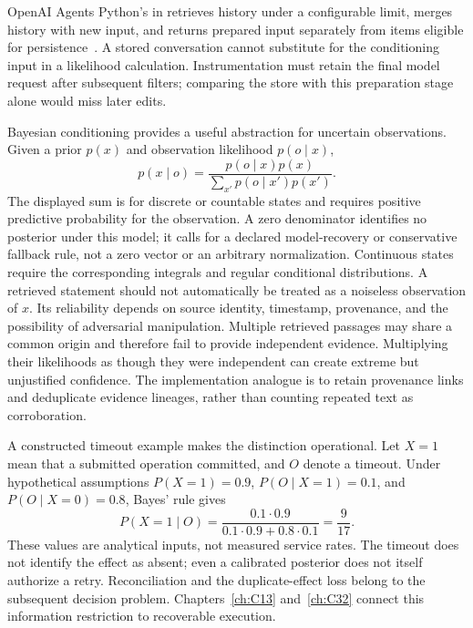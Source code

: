 OpenAI Agents Python's  in  retrieves history under a configurable limit, merges history with new input, and returns prepared input separately from items eligible for persistence~\cite{ch01_openai_sdk_20261029}. A stored conversation cannot substitute for the conditioning input in a likelihood calculation. Instrumentation must retain the final model request after subsequent filters; comparing the store with this preparation stage alone would miss later edits.


Bayesian conditioning provides a useful abstraction for uncertain observations. Given a prior $p(x)$ and observation likelihood $p(o\mid x)$,
\begin{equation}
 p(x\mid o)=\frac{p(o\mid x)p(x)}{\sum_{x'}p(o\mid x')p(x')}.
\end{equation}
The displayed sum is for discrete or countable states and requires positive predictive probability for the observation. A zero denominator identifies no posterior under this model; it calls for a declared model-recovery or conservative fallback rule, not a zero vector or an arbitrary normalization. Continuous states require the corresponding integrals and regular conditional distributions. A retrieved statement should not automatically be treated as a noiseless observation of $x$. Its reliability depends on source identity, timestamp, provenance, and the possibility of adversarial manipulation. Multiple retrieved passages may share a common origin and therefore fail to provide independent evidence. Multiplying their likelihoods as though they were independent can create extreme but unjustified confidence. The implementation analogue is to retain provenance links and deduplicate evidence lineages, rather than counting repeated text as corroboration.

A constructed timeout example makes the distinction operational. Let $X=1$ mean that a submitted operation committed, and $O$ denote a timeout. Under hypothetical assumptions $P(X=1)=0.9$, $P(O\mid X=1)=0.1$, and $P(O\mid X=0)=0.8$, Bayes' rule gives
\begin{equation}
 P(X=1\mid O)=\frac{0.1\cdot0.9}{0.1\cdot0.9+0.8\cdot0.1}
 =\frac9{17}.
\end{equation}
These values are analytical inputs, not measured service rates. The timeout does not identify the effect as absent; even a calibrated posterior does not itself authorize a retry. Reconciliation and the duplicate-effect loss belong to the subsequent decision problem. Chapters~\ref{ch:C13} and~\ref{ch:C32} connect this information restriction to recoverable execution.

